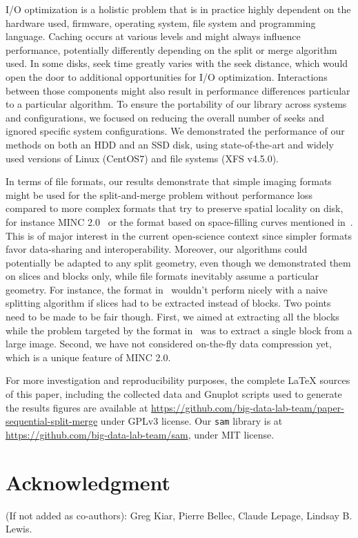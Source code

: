\documentclass[10pt, conference, compsocconf]{IEEEtran}
\begin{document}
I/O optimization is a holistic problem that is in practice highly
dependent on the hardware used, firmware, operating system, file
system and programming language. Caching occurs at various levels and
might always influence performance, potentially differently depending
on the split or merge algorithm used. In some disks, seek time greatly
varies with the seek distance, which would open the door to additional
opportunities for I/O optimization. Interactions between those
components might also result in performance differences particular to
a particular algorithm. To ensure the portability of our library
across systems and configurations, we focused on reducing the overall
number of seeks and ignored specific system configurations. We
demonstrated the performance of our methods on both an HDD and an SSD
disk, using state-of-the-art and widely used versions of Linux
(CentOS7) and file systems (XFS v4.5.0).

In terms of file formats, our results demonstrate that simple imaging
formats might be used for the split-and-merge problem without
performance loss compared to more complex formats that try to preserve
spatial locality on disk, for instance MINC 2.0~\cite{vincent2016minc}
or the format based on space-filling curves mentioned
in~\cite{burns2013open}. This is of major interest in the current
open-science context since simpler formats favor data-sharing and
interoperability.  Moreover, our algorithms could potentially be
adapted to any split geometry, even though we demonstrated them on
slices and blocks only, while file formats inevitably assume a
particular geometry. For instance, the format in~\cite{burns2013open}
wouldn't perform nicely with a naive splitting algorithm if slices had
to be extracted instead of blocks.  Two points need to be made to be
fair though. First, we aimed at extracting all the blocks while the
problem targeted by the format in~\cite{burns2013open} was to extract
a single block from a large image. Second, we have not considered
on-the-fly data compression yet, which is a unique feature of MINC
2.0.

For more investigation and reproducibility purposes, the complete \LaTeX
sources of this paper, including the collected data and Gnuplot
scripts used to generate the results figures are available at
\url{https://github.com/big-data-lab-team/paper-sequential-split-merge}
under GPLv3 license. Our \texttt{sam} library is at
\url{https://github.com/big-data-lab-team/sam}, under MIT license.


\section*{Acknowledgment}

(If not added as co-authors): Greg Kiar, Pierre Bellec, Claude Lepage, Lindsay B. Lewis.



\end{document}
